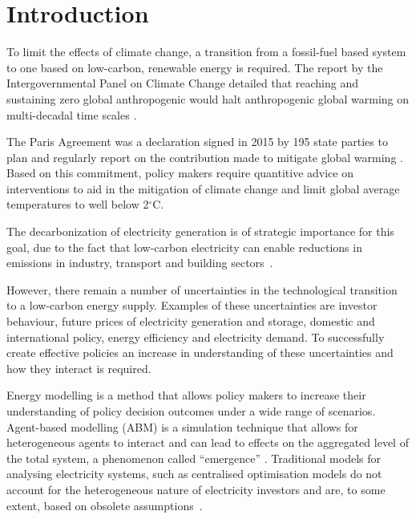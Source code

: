 \documentclass[final,3p,times,twocolumn,numbers]{elsarticle}
\begin{document}

\section{Introduction}
\label{sec:intro}


To limit the effects of climate change, a transition from a fossil-fuel based system to one based on low-carbon, renewable energy is required. The report by the Intergovernmental Panel on Climate Change detailed that reaching and sustaining zero global anthropogenic  would halt anthropogenic global warming on multi-decadal time scales \cite{Masson-Delmotte2018}. 

The Paris Agreement was a declaration signed in 2015 by 195 state parties to plan and regularly report on the contribution made to mitigate global warming \cite{May2002}. Based on this commitment, policy makers require quantitive advice on interventions to aid in the mitigation of climate change and limit global average temperatures to well below 2$^{\circ}$C. 

The decarbonization of electricity generation is of strategic importance for this goal, due to the fact that low-carbon electricity can enable reductions in  emissions in industry, transport and building sectors~\cite{Salas2017}. 

However, there remain a number of uncertainties in the technological transition to a low-carbon energy supply. Examples of these uncertainties are investor behaviour, future prices of electricity generation and storage, domestic and international policy, energy efficiency and electricity demand. To successfully create effective policies an increase in understanding of these uncertainties and how they interact is required.

Energy modelling is a method that allows policy makers to increase their understanding of policy decision outcomes under a wide range of scenarios. Agent-based modelling (ABM) is a simulation technique that allows for heterogeneous agents to interact and can lead to effects on the aggregated level of the total system, a phenomenon called ``emergence'' \cite{EpsteinJoshuaM.author.GSSS}. Traditional models for analysing electricity systems, such as centralised optimisation models do not account for the heterogeneous nature of electricity investors and are, to some extent, based on obsolete assumptions~\cite{Ringler2016}.
\end{document}
